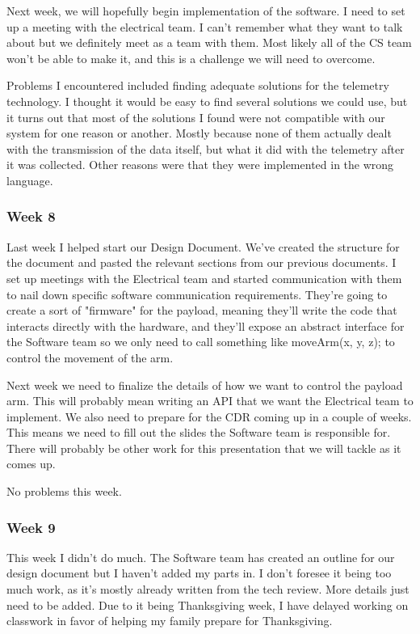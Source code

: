 Next week, we will hopefully begin implementation of the software. I need to set up a meeting with the electrical team. I can't remember what they want to talk about but we definitely meet as a team with them. Most likely all of the CS team won't be able to make it, and this is a challenge we will need to overcome.

Problems I encountered included finding adequate solutions for the telemetry technology. I thought it would be easy to find several solutions we could use, but it turns out that most of the solutions I found were not compatible with our system for one reason or another. Mostly because none of them actually dealt with the transmission of the data itself, but what it did with the telemetry after it was collected. Other reasons were that they were implemented in the wrong language.

\subsubsection{Week 8}
Last week I helped start our Design Document. We've created the structure for the document and pasted the relevant sections from our previous documents. I set up meetings with the Electrical team and started communication with them to nail down specific software communication requirements. They're going to create a sort of "firmware" for the \gls{payload}, meaning they'll write the code that interacts directly with the hardware, and they'll expose an abstract interface for the Software team so we only need to call something like moveArm(x, y, z); to control the movement of the arm.

Next week we need to finalize the details of how we want to control the \gls{payload} arm. This will probably mean writing an API that we want the Electrical team to implement. We also need to prepare for the CDR coming up in a couple of weeks. This means we need to fill out the slides the Software team is responsible for. There will probably be other work for this presentation that we will tackle as it comes up.

No problems this week.

\subsubsection{Week 9}
This week I didn't do much. The Software team has created an outline for our design document but I haven't added my parts in. I don't foresee it being too much work, as it's mostly already written from the tech review. More details just need to be added. Due to it being Thanksgiving week, I have delayed working on classwork in favor of helping my family prepare for Thanksgiving.

